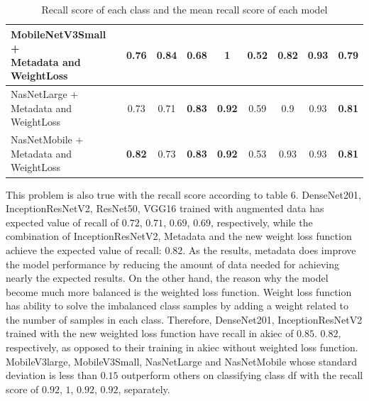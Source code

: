 \begin{table}[h]
\begin{tabular}{|l | c | c | c | c | c | c | c | c|}
		\hline
		\thead{MobileNetV3Small +\\Metadata and WeightLoss} & 0.76 & 0.84 & 0.68 & \textbf{1} & 0.52 & 0.82 & 0.93 & 0.79\\
		\hline
		\thead{NasNetLarge +\\Metadata and WeightLoss} & 0.73 & 0.71 & \textbf{0.83} & \textbf{0.92} & 0.59 & 0.9 & 0.93 & \textbf{0.81}\\
		\hline
		\thead{NasNetMobile +\\Metadata and WeightLoss} & \textbf{0.82} & 0.73 & \textbf{0.83} & \textbf{0.92} & 0.53 & 0.93 & 0.93 & \textbf{0.81}\\
		\hline
	\end{tabular}
	\caption{Recall score of each class and the mean recall score of each model}
	\label{table:6}
\end{table}
\FloatBarrier
This problem is also true with the recall score according to table 6. DenseNet201, InceptionResNetV2, ResNet50, VGG16 trained with augmented data has expected value of recall of $0.72$, $0.71$, $0.69$, $0.69$, respectively, while the combination of InceptionResNetV2, Metadata and the new weight loss function achieve the expected value of recall: $0.82$.
As the results, metadata does improve the model performance by reducing the amount of data needed for achieving nearly the expected results. On the other hand, the reason why the model become much more balanced is the weighted loss function. Weight loss function has ability to solve the imbalanced class samples by adding a weight related to the number of samples in each class. Therefore, DenseNet201, InceptionResNetV2 trained with the new weighted loss function have recall in akiec of $0.85$. $0.82$, respectively, as opposed to their training in akiec without weighted loss function. MobileV3large, MobileV3Small, NasNetLarge and NasNetMobile whose standard deviation is less than $0.15$ outperform others on classifying class df with the recall score of $0.92$, $1$, $0.92$, $0.92$, separately.\\ 
